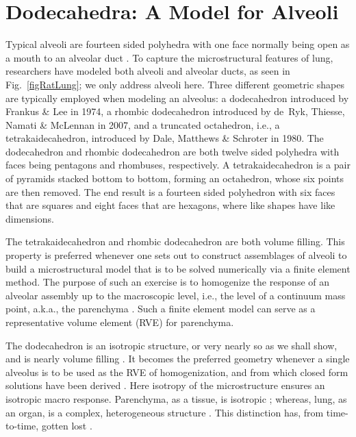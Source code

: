 \part{Dodecahedra: A Model for Alveoli}
\label{partDodecahedron}

Typical alveoli are fourteen sided polyhedra with one face normally being open as a mouth to an alveolar duct \cite{HoppinHildebrandt77}.  To capture the microstructural features of lung, researchers have modeled both alveoli and alveolar ducts, as seen in Fig.~\ref{figRatLung}; we only address alveoli here.  Three different geometric shapes are typically employed when modeling an alveolus: a dodecahedron introduced by Frankus \& Lee \cite{FrankusLee74} in 1974, a rhombic dodecahedron introduced by de~Ryk, Thiesse, Namati \& McLennan \cite{Ryketal07} in 2007, and a truncated octahedron, i.e., a tetrakaidecahedron, introduced by Dale, Matthews \& Schroter \cite{Daleetal80} in 1980.  The dodecahedron and rhombic dodecahedron are both twelve sided polyhedra with faces being pentagons and rhombuses, respectively.  A tetrakaidecahedron is a pair of pyramids stacked bottom to bottom, forming an octahedron, whose six points are then removed.  The end result is a fourteen sided polyhedron with six faces that are squares and eight faces that are hexagons, where like shapes have like dimensions.

The tetrakaidecahedron and rhombic dodecahedron are both volume filling.  This property is preferred whenever one sets out to construct assemblages of alveoli to build a micro\-structural model that is to be solved numerically via a finite element method.  The purpose of such an exercise is to homogenize the response of an alveolar assembly up to the macroscopic level, i.e., the level of a continuum mass point, a.k.a., the parenchyma \cite{Daleetal80,DennySchroter95,DennySchroter97,DennySchroter00,Koweetal86,Ryketal07,Chenetal14}.  Such a finite element model can serve as a representative volume element (RVE) for parenchyma.

The dodecahedron is an isotropic structure, or very nearly so as we shall show, and is nearly volume filling \cite{Kimmeletal87}.  It becomes the preferred geometry whenever a single alveolus is to be used as the RVE of homo\-genization, and from which closed form solutions have been derived \cite{BudianskyKimmel87,KimmelBudiansky90,Kimmeletal87,Freedetal12}.  Here isotropy of the microstructure ensures an isotropic macro response.  Parenchyma, as a tissue, is isotropic \cite{Weedetal15,Fung88,Hughesetal72}; whereas, lung, as an organ, is a complex, heterogeneous structure \cite{Mead73,West07}.  This distinction has, from time-to-time, gotten lost \cite{DennySchroter06}.  

